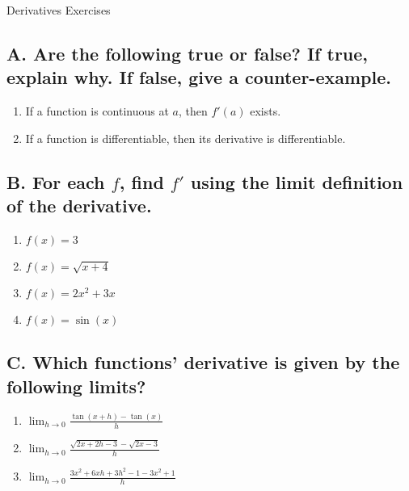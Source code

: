 \documentclass{article}
\begin{document}
\begin{center}
\begin{Huge}Derivatives Exercises\end{Huge}
\end{center}


\subsection*{A. Are the following true or false? If true, explain why. If false, give a counter-example.}
\begin{enumerate}
\item If a function is continuous at $a$, then $f'(a)$ exists.
\item If a function is differentiable, then its derivative is differentiable.
\end{enumerate}

\subsection*{B. For each $f$, find $f'$ using the limit definition of the derivative.}
\begin{multicols}{4}
\begin{enumerate}
\item $f(x)=3$
\item $f(x)=\sqrt{x+4}$
\item $f(x)=2x^2 + 3x$
\item $f(x)=\sin(x)$
\end{enumerate}
\end{multicols}

\subsection*{C. Which functions' derivative is given by the following limits?}
\begin{multicols}{3}
\begin{enumerate}
\item $\displaystyle\lim_{h\to 0}\frac{\tan(x+h)-\tan(x)}{h}$
\item $\displaystyle\lim_{h\to 0}\frac{\sqrt{2x+2h-3}-\sqrt{2x-3}}{h}$
\item $\displaystyle\lim_{h\to 0}\frac{3x^2+6xh+3h^2-1-3x^2+1}{h}$
\end{enumerate}
\end{multicols}
\end{document}
